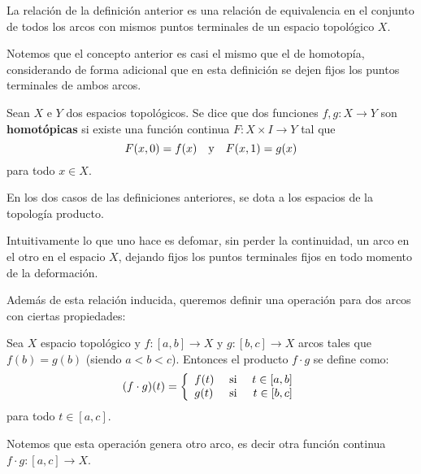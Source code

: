 \documentclass{article}
\theoremstyle{largebreak}
\newcommand\cf[3]{\ensuremath{#1:#2\rightarrow#3}}
\begin{document}
    \begin{propo}
        La relación de la definición anterior es una relación de equivalencia en el conjunto de todos los arcos con mismos puntos terminales de un espacio topológico $X$.
    \end{propo}

    Notemos que el concepto anterior es casi el mismo que el de homotopía, considerando de forma adicional que en esta definición se dejen fijos los puntos terminales de ambos arcos.

    \begin{mydef}
        Sean $X$ e $Y$ dos espacios topológicos. Se dice que dos funciones $\cf{f,g}{X}{Y}$ son \textbf{homotópicas} si existe una función continua $\cf{F}{X\times I}{Y}$ tal que
        \begin{equation*}
            F(x,0)=f(x)\quad\textup{y}\quad F(x,1)=g(x)
        \end{equation*}
        para todo $x\in X$.
    \end{mydef}

    \begin{obs}
        En los dos casos de las definiciones anteriores, se dota a los espacios de la topología producto.
    \end{obs}

    Intuitivamente lo que uno hace es defomar, sin perder la continuidad, un arco en el otro en el espacio $X$, dejando fijos los puntos terminales fijos en todo momento de la deformación.

    Además de esta relación inducida, queremos definir una operación para dos arcos con ciertas propiedades:

    \begin{mydef}
        Sea $X$ espacio topológico y $\cf{f}{[a,b]}{X}$ y $\cf{g}{[b,c]}{X}$ arcos tales que $f(b)=g(b)$ (siendo $a<b<c$). Entonces el producto $f\cdot g$ se define como:
        \begin{equation*}
            (f\cdot g)(t)=\left\{
                \begin{array}{lcr}
                    f(t) & \textup{ si } & t\in[a,b]\\
                    g(t) & \textup{ si } & t\in[b,c]\\
                \end{array}
            \right.
        \end{equation*}
        para todo $t\in[a,c]$.
    \end{mydef}

    \begin{obs}
        Notemos que esta operación genera otro arco, es decir otra función continua $\cf{f\cdot g}{[a,c]}{X}$.
    \end{obs}
    
\end{document}
